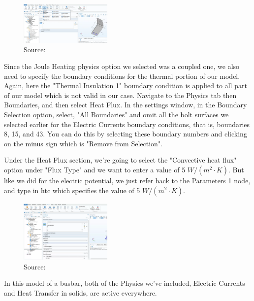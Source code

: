 \begin{figure}[ht!]
  \centering
  \includegraphics[width=0.4\textwidth]{Chapters/Figures/Chapter 3 Figures/Electric Currents Boundary Conditions.png}
  \caption{Source: \cite{}}
  \label{}
\end{figure}

Since the Joule Heating physics option we selected was a coupled one, we also need to specify the boundary conditions for the thermal portion of our model. Again, here the "Thermal Insulation 1" boundary condition is applied to all part of our model which is not valid in our case. Navigate to the Physics tab then Boundaries, and then select Heat Flux. In the settings window, in the Boundary Selection option, select, "All Boundaries" and omit all the bolt surfaces we selected earlier for the Electric Currents boundary conditions, that is, boundaries 8, 15, and 43. You can do this by selecting these boundary numbers and clicking on the minus sign which is "Remove from Selection".

Under the Heat Flux section, we're going to select the "Convective heat flux" option under "Flux Type" and we want to enter a value of 5 $W/(m^2\cdot K)$. But like we did for the electric potential, we just refer back to the Parameters 1 node, and type in htc which specifies the value of 5 $W/(m^2\cdot K)$.

\begin{figure}[ht!]
  \centering
  \includegraphics[width=0.4\textwidth]{Chapters/Figures/Chapter 3 Figures/Heat Flux Boundary Conditions.png}
  \caption{Source: \cite{}}
  \label{}
\end{figure}

In this model of a busbar, both of the Physics we've included, Electric Currents and Heat Transfer in solids, are active everywhere.

